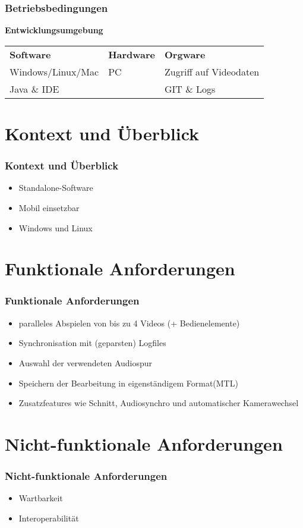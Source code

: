 \documentclass[12pt, xcolor=table]{beamer}
\begin{document}
\begin{frame}
	\frametitle{Betriebsbedingungen}
	\textbf{Entwicklungsumgebung}\vspace{0.2cm}
	\begin{center}
	\small
	\begin{tabularx}{\framewidth}{lll}
		\textbf{Software}&\textbf{Hardware}&\textbf{Orgware}\\
		Windows/Linux/Mac&PC&Zugriff auf Videodaten\\
		Java \& IDE&&GIT \& Logs\\
	\end{tabularx}
	\end{center}
\end{frame}

\section{Kontext und Überblick}
\begin{frame}
	\frametitle{Kontext und Überblick}
	\begin{itemize}
		\item Standalone-Software
		\item Mobil einsetzbar
		\item Windows und Linux
	\end{itemize}
\end{frame}

\section{Funktionale Anforderungen}
\begin{frame}
	\frametitle{Funktionale Anforderungen}
	\begin{itemize}
		\item paralleles Abspielen von bis zu 4 Videos (+ Bedienelemente)
		\item Synchronisation mit (geparsten) Logfiles
		\item Auswahl der verwendeten Audiospur
		\item Speichern der Bearbeitung in eigenständigem Format(MTL)
		\item Zusatzfeatures wie Schnitt, Audiosynchro und automatischer Kamerawechsel
	\end{itemize}
\end{frame}

\section{Nicht-funktionale Anforderungen}
\begin{frame}
	\frametitle{Nicht-funktionale Anforderungen}
	\begin{itemize}
		\item Wartbarkeit 
		\item Interoperabilität
	\end{itemize}
\end{frame}
\end{document}
